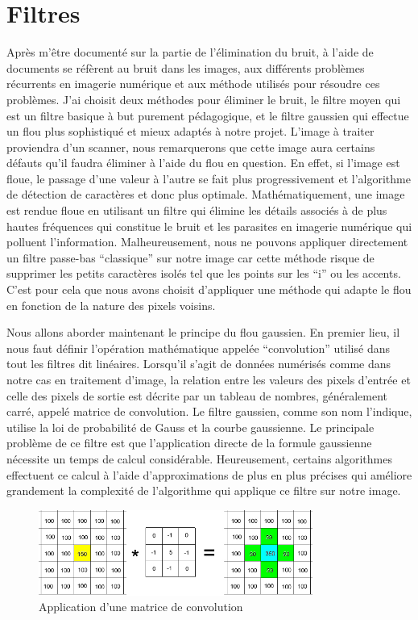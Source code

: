 \documentclass[11pt]{report}
\begin{document}
\section{Filtres}


Après m'être documenté sur la partie de l'élimination du bruit, à l'aide de documents se réfèrent au bruit dans les images, aux différents problèmes récurrents en imagerie numérique et aux méthode utilisés pour résoudre ces problèmes. J'ai choisit deux méthodes pour éliminer le bruit, le filtre moyen qui est un filtre basique à but purement pédagogique, et le filtre gaussien qui effectue un flou plus sophistiqué et mieux adaptés à notre projet. L'image à traiter proviendra d'un scanner, nous remarquerons que cette image aura certains défauts qu'il faudra éliminer à l'aide du flou en question. En effet, si l'image est floue, le passage d'une valeur à l'autre se fait plus progressivement et l'algorithme de détection de caractères et donc plus optimale. Mathématiquement, une image est rendue floue en utilisant un filtre qui élimine les détails associés à de plus hautes fréquences qui constitue le bruit et les parasites en imagerie numérique qui polluent l'information. Malheureusement, nous ne pouvons appliquer directement un filtre passe-bas ``classique'' sur notre image car cette méthode risque de supprimer les petits caractères isolés tel que les points sur les ``i'' ou les accents. C'est pour cela que nous avons choisit d'appliquer une méthode qui adapte le flou en fonction de la nature des pixels voisins.

Nous allons aborder maintenant le principe du flou gaussien. En premier lieu, il nous faut définir l'opération mathématique appelée ``convolution'' utilisé dans tout les filtres dit linéaires. Lorsqu'il s'agit de données numérisés comme dans notre cas en traitement d'image, la relation entre les valeurs des pixels d'entrée et celle des pixels de sortie est décrite par un tableau de nombres, généralement carré, appelé matrice de convolution.  Le filtre gaussien, comme son nom l'indique, utilise la loi de probabilité de Gauss et la courbe gaussienne. Le principale problème de ce filtre est que l'application directe de la formule gaussienne nécessite un temps de calcul considérable. Heureusement, certains algorithmes effectuent ce calcul à l'aide d'approximations de plus en plus précises qui améliore grandement la complexité de l'algorithme qui applique ce filtre sur notre image.

\begin{figure}[htbp]
\centering
\includegraphics[width=9cm]{matconvol.jpg}
\caption{Application d'une matrice de convolution}
\end{figure}
\end{document}
